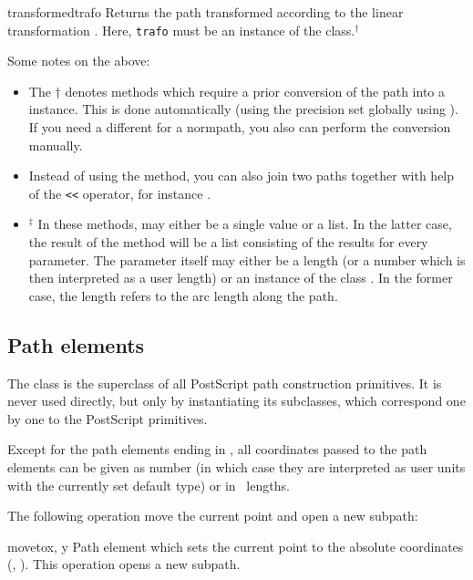 \begin{methoddesc}{transformed}{trafo}
  Returns the path transformed according to the linear transformation
  . Here, \texttt{trafo} must be an instance of the
   class.$^\dagger$
\end{methoddesc}

Some notes on the above:
\begin{itemize}
\item The $\dagger$ denotes methods which require a prior
  conversion of the path into a  instance. This is
  done automatically (using the precision  set globally
  using ). If you need a different  for
  a normpath, you also can perform the conversion manually. 
\item Instead of using the  method, you can also join two
paths together with help of the \verb|<<| operator, for instance
. 
\item $^\ddagger$ In these methods,  may either be a
  single value or a list. In the latter case, the result of the method
  will be a list consisting of the results for every parameter.  The
  parameter itself may either be a length (or a number which is then
  interpreted as a user length) or an instance of the class
  . In the former case, the length refers to the
  arc length along the path. 
\end{itemize}

\subsection{Path elements}

\label{path:pathitem}

The class  is the superclass of all PostScript path
construction primitives. It is never used directly, but only by
instantiating its subclasses, which correspond one by one to the
PostScript primitives. 

Except for the path elements ending in , all coordinates
passed to the path elements can be given as number (in which case they
are interpreted as user units with the currently set default type) or in
\PyX\ lengths. 

The following operation move the current point and open a new subpath:

\begin{classdesc}{moveto}{x, y}
Path element which sets the current point to the absolute coordinates (,
). This operation opens a new subpath. 
\end{classdesc}

